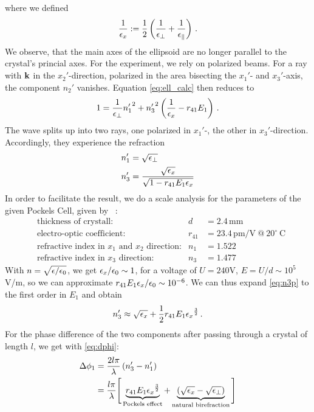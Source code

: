 where we defined 
\begin{equation}
    \frac{1}{\epsilon_x} := 
    \frac{1}{2} \left( \frac{1}{\epsilon_\perp} + \frac{1}{\epsilon_\parallel}\right) \, .
    \label{eq:def_eps_x}
\end{equation}
We observe, that the main axes of the ellipsoid are no longer parallel to the 
crystal's princial axes.
For the experiment, we rely on polarized beams. For a ray with 
$\mathbf{k}$ in the $x_2'$-direction, polarized in the area bisecting the 
$x_1'$- and $x_3'$-axis, the component $n_2'$ vanishes.
Equation \eqref{eq:ell_calc} then reduces to
\begin{equation}
    1 = \frac{1}{\epsilon_\perp}  {n_1'}^2 + 
    {n_3'}^2 \left(\frac{1}{\epsilon_x} - r_{41} E_1 \right) \, .
    \label{eq:ell_02}
\end{equation}
The wave splits up into two rays, one polarized in $x_1'$-, 
the other in $x_3'$-direction. Accordingly, they experience the refraction 
\begin{align}
    n_1' &= \sqrt{\epsilon_\perp} 
    \label{eq:n1p} \\
    n_3' &= \frac{\sqrt{\epsilon_x}}{\sqrt{1 - r_{41} E_1 \epsilon_x}}
    \label{eq:n3p} 
\end{align}
In order to facilitate the result, we do a scale analysis for the 
parameters of the given Pockels Cell, given by
~\cite{versuchsanleitung}:
\begin{align*}
    &\text{thickness of crystall:} &d &= 2.4 \, \text{mm} \\
    &\text{electro-optic coefficient:} &r_{41} &= 23.4 
        \,\mathrm{pm / V \ @ \ 20^\circ \ C} \\
    &\text{refractive index in $x_1$ and $x_2$ direction:} &n_1 &= 1.522 \\
    &\text{refractive index in $x_3$ direction:} &n_3 &= 1.477 
\end{align*}
With $n = \sqrt{\epsilon / \epsilon_0}$, we get $\epsilon_x / \epsilon_0 \sim 1$, for 
a voltage of $U = 240$V, $E = U / d \sim 10^5$V/m, 
so we can approximate $r_{41} E_1 \epsilon_x / \epsilon_0 \sim 10^{-6}$. 
We can thus expand \eqref{eq:n3p} to the first order in $E_1$ and 
obtain
\begin{equation}
    n_3' \approx \sqrt{\epsilon_x} + 
        \frac{1}{2} r_{41} E_1 {\epsilon_x}^\frac{3}{2}
    \label{eq:n3paprrox} \, .
\end{equation}
For the phase difference of the two components after passing through a crystal 
of length $l$, we get with \eqref{eq:dphi}:
\begin{equation}
    \begin{split}
    \Delta \phi_1 
    &= \frac{2l \pi}{\lambda} \left(n_3' - n_1' \right) \\
    &= \frac{l \pi}{\lambda}\Bigg[
    \underbrace{r_{41} E_1 {\epsilon_x}^\frac{3}{2}}_\text{Pockels effect} + 
    \underbrace{\left(\sqrt{\epsilon_x} - \sqrt{\epsilon_\perp} 
    \right)}_\text{natural birefraction}
    \Bigg]
    \end{split}
    \label{eq:dphi_1}
\end{equation}
